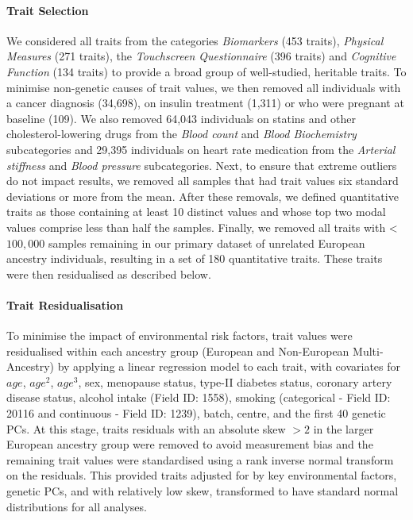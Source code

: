 \documentclass[12pt]{zHenriquesLab-StyleBioRxiv}
\begin{document}
\paragraph*{Trait Selection} 
We considered all traits from the categories \textit{Biomarkers} (453 traits), 
\textit{Physical Measures} (271 traits), the \textit{Touchscreen Questionnaire} (396 traits) 
and \textit{Cognitive Function} (134 traits) to provide a broad group of well-studied, heritable traits. 
To minimise non-genetic causes of trait values, we then removed all individuals with a cancer diagnosis (34,698), 
on insulin treatment (1,311) or who were pregnant at baseline (109). We also removed 64,043 individuals 
on statins and other cholesterol-lowering drugs from the \textit{Blood count} 
and \textit{Blood Biochemistry} subcategories and 29,395 individuals
on heart rate medication from the \textit{Arterial stiffness} and \textit{Blood pressure} subcategories.
Next, to ensure that extreme outliers do not impact results, we removed all samples that had 
trait values six standard deviations or more from the mean. After these removals, we defined quantitative traits as 
those containing at least 10 distinct values and whose top two modal values comprise less than 
half the samples. Finally, we removed all traits with < $100,000$ samples remaining in our 
primary dataset of unrelated European ancestry individuals, resulting in a set of 180 quantitative 
traits. These traits were then residualised as described below. 
%
\paragraph*{Trait Residualisation}
To minimise the impact of environmental risk factors, trait values were 
residualised within each ancestry group (European and Non-European Multi-Ancestry) by applying a linear regression 
model to each trait, with covariates for $age$, $age^2$, $age^3$, sex, menopause status, %
type-II diabetes status, coronary artery disease status, alcohol intake (Field ID: 1558), 
smoking (categorical - Field ID: 20116 and continuous - Field ID: 1239), 
batch, centre, and the first 40 genetic PCs.  
At this stage, traits residuals with an absolute skew $>2$ \cite{skew_book} 
in the larger European ancestry group were removed to avoid measurement bias and 
the remaining trait values were standardised using a rank inverse 
normal transform on the residuals. This provided traits adjusted for by key environmental factors, genetic 
PCs, and with relatively low skew, transformed to have standard normal distributions for all analyses. 
%
\end{document}
